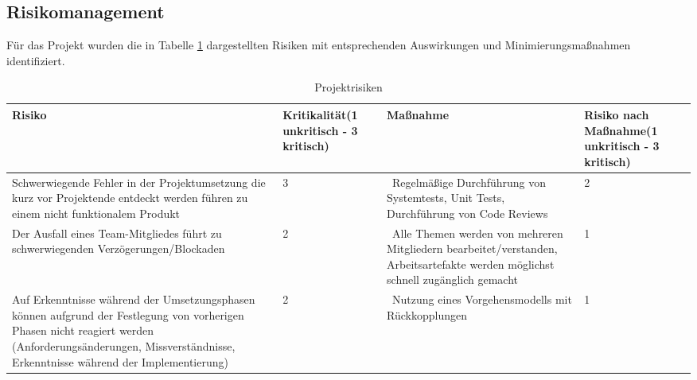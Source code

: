 \documentclass{scrartcl}
\begin{document}
\subsection{Risikomanagement}
Für das Projekt wurden die in Tabelle \ref{tab:Projektrisiken} dargestellten Risiken mit entsprechenden Auswirkungen und Minimierungsmaßnahmen identifiziert.
\begin{table}[h]
	\begin{tabular}{p{.3\linewidth}|p{.15\linewidth}|p{.3\linewidth}|p{.15\linewidth}}
	Risiko & Kritikalität\linebreak (1 unkritisch - 3 kritisch) & Maßnahme & Risiko nach Maßnahme\linebreak (1 unkritisch - 3 kritisch)\\
	\hline
	Schwerwiegende Fehler in der Projektumsetzung die kurz vor Projektende entdeckt werden führen zu einem nicht funktionalem Produkt & 3 & Regelmäßige Durchführung von Systemtests, Unit Tests, Durchführung von Code Reviews & 2 \\
	\hline
	Der Ausfall eines Team-Mitgliedes führt zu schwerwiegenden Verzögerungen/Blockaden & 2 & Alle Themen werden von mehreren Mitgliedern bearbeitet/verstanden, Arbeitsartefakte werden möglichst schnell zugänglich gemacht & 1 \\
	\hline
	Auf Erkenntnisse während der Umsetzungsphasen können aufgrund der Festlegung von vorherigen Phasen nicht reagiert werden (Anforderungsänderungen, Missverständnisse, Erkenntnisse während der Implementierung)  & 2 & Nutzung eines Vorgehensmodells mit Rückkopplungen & 1 \\
	\hline
	\end{tabular}
	\caption{Projektrisiken}
	\label{tab:Projektrisiken}
\end{table}
\end{document}
